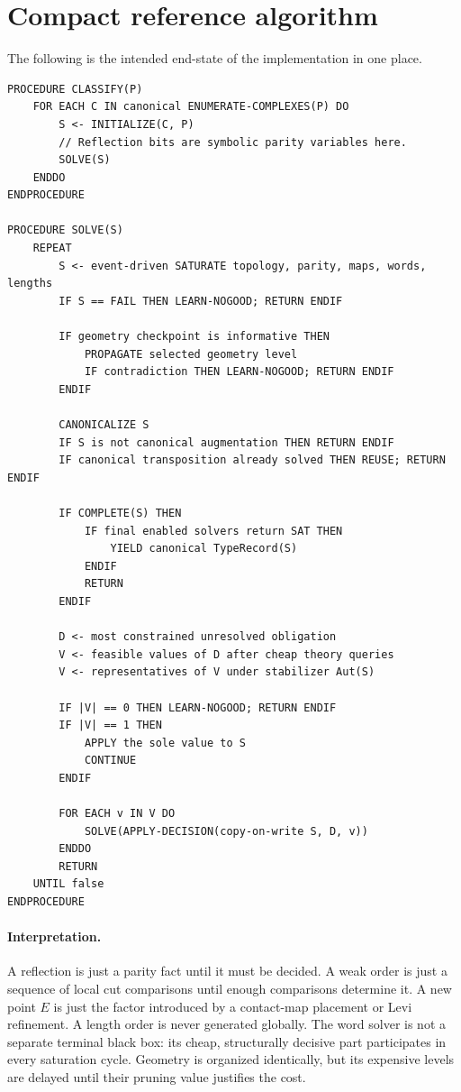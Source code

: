 \documentclass[11pt]{article}
\begin{document}
\section{Compact reference algorithm}

The following is the intended end-state of the implementation in one place.

\begin{lstlisting}[caption={Compact production algorithm.}]
PROCEDURE CLASSIFY(P)
    FOR EACH C IN canonical ENUMERATE-COMPLEXES(P) DO
        S <- INITIALIZE(C, P)
        // Reflection bits are symbolic parity variables here.
        SOLVE(S)
    ENDDO
ENDPROCEDURE

PROCEDURE SOLVE(S)
    REPEAT
        S <- event-driven SATURATE topology, parity, maps, words, lengths
        IF S == FAIL THEN LEARN-NOGOOD; RETURN ENDIF

        IF geometry checkpoint is informative THEN
            PROPAGATE selected geometry level
            IF contradiction THEN LEARN-NOGOOD; RETURN ENDIF
        ENDIF

        CANONICALIZE S
        IF S is not canonical augmentation THEN RETURN ENDIF
        IF canonical transposition already solved THEN REUSE; RETURN ENDIF

        IF COMPLETE(S) THEN
            IF final enabled solvers return SAT THEN
                YIELD canonical TypeRecord(S)
            ENDIF
            RETURN
        ENDIF

        D <- most constrained unresolved obligation
        V <- feasible values of D after cheap theory queries
        V <- representatives of V under stabilizer Aut(S)

        IF |V| == 0 THEN LEARN-NOGOOD; RETURN ENDIF
        IF |V| == 1 THEN
            APPLY the sole value to S
            CONTINUE
        ENDIF

        FOR EACH v IN V DO
            SOLVE(APPLY-DECISION(copy-on-write S, D, v))
        ENDDO
        RETURN
    UNTIL false
ENDPROCEDURE
\end{lstlisting}

\paragraph{Interpretation.}
A reflection is just a parity fact until it must be decided.  A weak order is just a sequence of local cut comparisons until enough comparisons determine it.  A new point $E$ is just the factor introduced by a contact-map placement or Levi refinement.  A length order is never generated globally.  The word solver is not a separate terminal black box: its cheap, structurally decisive part participates in every saturation cycle.  Geometry is organized identically, but its expensive levels are delayed until their pruning value justifies the cost.
\end{document}
